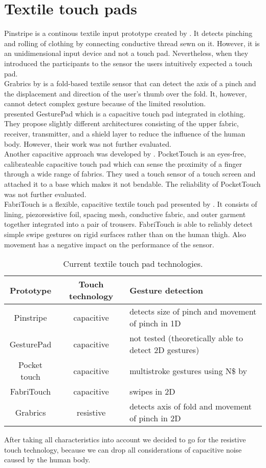 \section{Textile touch pads}
Pinstripe is a continous textile input prototype created by \cite{Karrer:2010:PEC:1866218.1866255}. It detects pinching and rolling of clothing by connecting conductive thread sewn on it. However, it is an unidimensional input device and not a touch pad. Nevertheless, when they introduced the participants to the sensor the users intuitively expected a touch pad. \\
Grabrics by \cite{hamdan} is a fold-based textile sensor that can detect the axis of a pinch and the displacement and direction of the user’s thumb over the fold. It, however, cannot detect complex gesture because of the limited resolution.\\
\cite{Rekimoto:2001:962092} presented GesturePad which is a capacitive touch pad integrated in clothing. They propose slightly different architectures consisting of the upper fabric, receiver, transmitter, and a shield layer to reduce the influence of the human body. However, their work was not further evaluated. \\
Another capacitive approach was developed by \cite{Saponas:2011:PTC:2047196.2047235}. PocketTouch is an eyes-free, calibrateable capacitive touch pad which can sense the proximity of a finger through a wide range of fabrics. They used a touch sensor of a touch screen and attached it to a base which makes it not bendable. The reliability of PocketTouch was not further evaluated. \\
FabriTouch is a flexible, capacitive textile touch pad presented by \cite{Heller:2014:FEF:2634317.2634345}. It consists of lining, piezoresistive foil, spacing mesh, conductive fabric, and outer garment together integrated into a pair of trousers. FabriTouch is able to reliably detect simple swipe gestures on rigid surfaces rather than on the human thigh. Also movement has a negative impact on the performance of the sensor.
\begin{table}
\begin{tabular}{ | c | c | p{3.8cm}|}
\hline
  Prototype & Touch technology & Gesture detection \\
  \hline
   Pinstripe & capacitive  & detects size of pinch and movement of pinch in 1D \\
   \hline
  GesturePad & capacitive &  not tested (theoretically able to detect 2D gestures) \\
  \hline
  Pocket touch & capacitive & multistroke gestures using N\$ by \cite{anthony2012n} \\
  \hline
  FabriTouch & capacitive & swipes in 2D \\
  \hline
  Grabrics & resistive & detects axis of fold and movement of pinch in 2D \\ 
  \hline
\end{tabular}
\caption{Current textile touch pad technologies.}
 \label{table:overview}
\end{table}

After taking all characteristics into account we decided to go for the resistive touch technology, because we can drop all considerations of capacitive noise caused by the human body. 